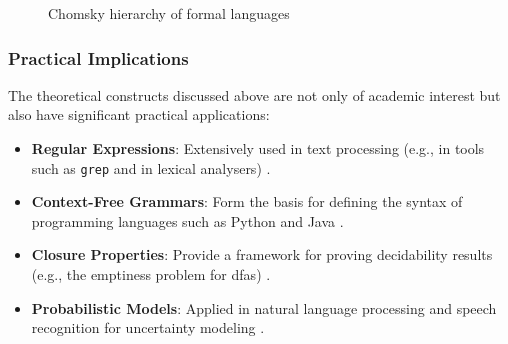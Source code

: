 \begin{figure}[h]
    \centering
    \caption{Chomsky hierarchy of formal languages}
    \label{fig:chomsky-hierarchy}
\end{figure}


\subsubsection{Practical Implications}
The theoretical constructs discussed above are not only of academic interest but also have significant practical applications:
\begin{itemize}
    \item \textbf{Regular Expressions}: Extensively used in text processing (e.g., in tools such as \texttt{grep} and in lexical analysers) \cite{kernighan1984unix}.
    \item \textbf{Context-Free Grammars}: Form the basis for defining the syntax of programming languages such as Python and Java \cite{rozenberg1997handbook}.
    \item \textbf{Closure Properties}: Provide a framework for proving decidability results (e.g., the emptiness problem for \glspl{dfa}) \cite{sipser2013introduction}.
    \item \textbf{Probabilistic Models}: Applied in natural language processing and speech recognition for uncertainty modeling \cite{droste2009handbook}.
\end{itemize}